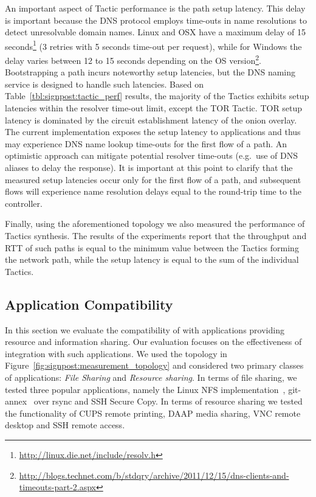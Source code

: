 An important aspect of Tactic performance is the path setup latency. This delay
is important because the DNS protocol employs time-outs in name resolutions to
detect unresolvable domain names. Linux and OSX have a maximum delay of 15
seconds\footnote{\url{http://linux.die.net/include/resolv.h}} (3 retries with 5
seconds time-out per request), while for Windows the delay varies between 12 to
15 seconds depending on the OS
version\footnote{\url{http://blogs.technet.com/b/stdqry/archive/2011/12/15/dns-clients-and-timeouts-part-2.aspx}}.
Bootstrapping a \signpost path incurs noteworthy setup latencies, but the DNS
naming service is designed to handle such latencies.  Based on
Table~\ref{tbl:signpost:tactic_perf} results, the majority of the Tactics
exhibits setup latencies within the resolver time-out limit, except the TOR
Tactic. TOR setup latency is dominated by the circuit establishment latency of
the onion overlay.  The current implementation exposes the setup latency to
applications and thus may experience DNS name lookup time-outs for the first flow
of a path. An optimistic approach can mitigate potential resolver time-outs
(e.g.~use of DNS aliases to delay the response). It is important at this point
to clarify that the measured setup latencies occur only for the first flow
of a path, and subsequent flows will experience name resolution delays
equal to the round-trip time to the \signpost controller. 

Finally, using the aforementioned topology we also measured the performance of
Tactics synthesis. The results of the experiments report that the throughput and
RTT of such paths is equal to the minimum value between the Tactics forming the
network path, while the setup latency is equal to the sum of the individual
Tactics. 

\subsection{Application Compatibility} \label{sec:sp-compatibility}

In this section we evaluate the compatibility of \signpost with applications
providing resource and information sharing. Our evaluation focuses on the
effectiveness of \signpost integration with such applications.  We used the
topology in Figure~\ref{fig:signpost:measurement_topology} and considered two
primary classes of applications: \emph{File Sharing} and \emph{Resource
  sharing}.  In terms of file sharing, we tested three popular applications, namely
the Linux NFS implementation~, git-annex~ over
rsync and SSH Secure Copy.  In terms of resource sharing we tested the
functionality of CUPS remote printing, DAAP media sharing, VNC remote desktop
and SSH remote access. 

